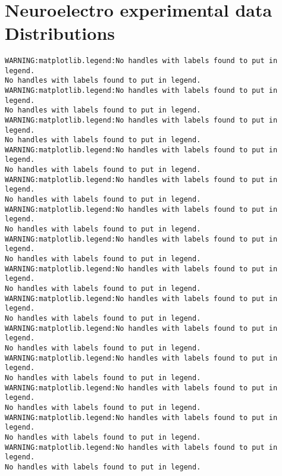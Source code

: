 
    

    
    \begin{center}
    \end{center}
    { \hspace*{\fill} \\}
    
    \hypertarget{neuroelectro-experimental-data-distributions}{%
\section{Neuroelectro experimental data
Distributions}\label{neuroelectro-experimental-data-distributions}}

    \begin{Verbatim}[commandchars=\\\{\}]
WARNING:matplotlib.legend:No handles with labels found to put in legend.
No handles with labels found to put in legend.
WARNING:matplotlib.legend:No handles with labels found to put in legend.
No handles with labels found to put in legend.
WARNING:matplotlib.legend:No handles with labels found to put in legend.
No handles with labels found to put in legend.
WARNING:matplotlib.legend:No handles with labels found to put in legend.
No handles with labels found to put in legend.
WARNING:matplotlib.legend:No handles with labels found to put in legend.
No handles with labels found to put in legend.
WARNING:matplotlib.legend:No handles with labels found to put in legend.
No handles with labels found to put in legend.
WARNING:matplotlib.legend:No handles with labels found to put in legend.
No handles with labels found to put in legend.
WARNING:matplotlib.legend:No handles with labels found to put in legend.
No handles with labels found to put in legend.
WARNING:matplotlib.legend:No handles with labels found to put in legend.
No handles with labels found to put in legend.
WARNING:matplotlib.legend:No handles with labels found to put in legend.
No handles with labels found to put in legend.
WARNING:matplotlib.legend:No handles with labels found to put in legend.
No handles with labels found to put in legend.
WARNING:matplotlib.legend:No handles with labels found to put in legend.
No handles with labels found to put in legend.
WARNING:matplotlib.legend:No handles with labels found to put in legend.
No handles with labels found to put in legend.
WARNING:matplotlib.legend:No handles with labels found to put in legend.
No handles with labels found to put in legend.

\end{Verbatim}
